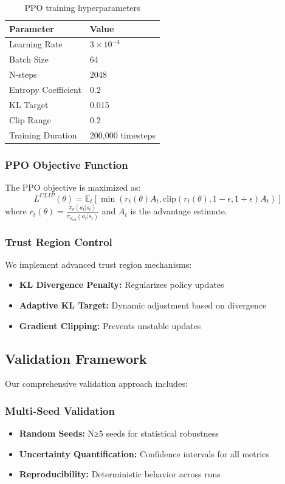\documentclass[10pt,journal]{IEEEtran}
\begin{document}
\begin{table}[h]
\centering
\begin{tabular}{ll}
\toprule
\textbf{Parameter} & \textbf{Value} \\
\midrule
Learning Rate & $3 \times 10^{-4}$ \\
Batch Size & 64 \\
N-steps & 2048 \\
Entropy Coefficient & 0.2 \\
KL Target & 0.015 \\
Clip Range & 0.2 \\
Training Duration & 200,000 timesteps \\
\bottomrule
\end{tabular}
\caption{PPO training hyperparameters}
\end{table}

\subsubsection{PPO Objective Function}
The PPO objective is maximized as:
\begin{equation}
L^{CLIP}(\theta) = \mathbb{E}_t \left[ \min\left(r_t(\theta)A_t, \text{clip}(r_t(\theta), 1-\epsilon, 1+\epsilon)A_t\right) \right]
\end{equation}
where $r_t(\theta) = \frac{\pi_\theta(a_t|s_t)}{\pi_{\theta_{old}}(a_t|s_t)}$ and $A_t$ is the advantage estimate.

\subsubsection{Trust Region Control}
We implement advanced trust region mechanisms:
\begin{itemize}
\item \textbf{KL Divergence Penalty:} Regularizes policy updates
\item \textbf{Adaptive KL Target:} Dynamic adjustment based on divergence
\item \textbf{Gradient Clipping:} Prevents unstable updates
\end{itemize}

\subsection{Validation Framework}
Our comprehensive validation approach includes:

\subsubsection{Multi-Seed Validation}
\begin{itemize}
\item \textbf{Random Seeds:} N≥5 seeds for statistical robustness
\item \textbf{Uncertainty Quantification:} Confidence intervals for all metrics
\item \textbf{Reproducibility:} Deterministic behavior across runs
\end{itemize}
\end{document}
